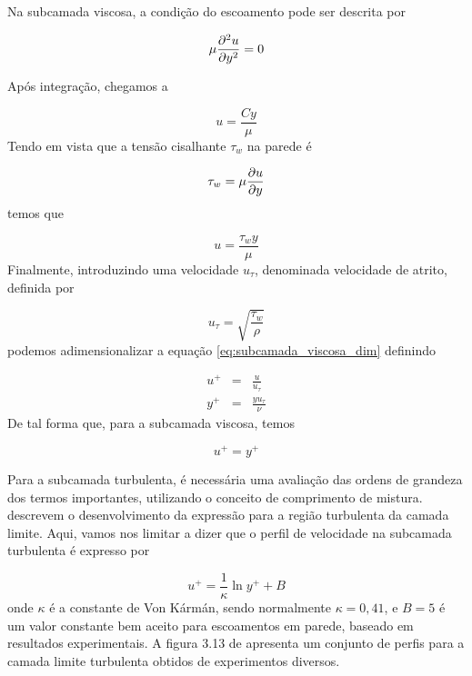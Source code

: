 Na subcamada viscosa, a condição do escoamento pode ser descrita por

\begin{equation}
  \mu\frac{\partial^2u}{\partial y^2} = 0
\end{equation}

Após integração, chegamos a

\begin{equation}
  u = \frac{Cy}{\mu}
\end{equation}
Tendo em vista que a tensão cisalhante $\tau_w$ na parede é

\begin{equation}
  \tau_w = \mu\frac{\partial u}{\partial y}
\end{equation}
temos que

\begin{equation}
  u = \frac{\tau_wy}{\mu}
  \label{eq:subcamada_viscosa_dim}
\end{equation}
Finalmente, introduzindo uma velocidade $u_{\tau}$, denominada velocidade de atrito, definida por

\begin{equation}
  u_{\tau} = \sqrt{\frac{\tau_w}{\rho}}
\end{equation}
podemos adimensionalizar a equação \ref{eq:subcamada_viscosa_dim} definindo

\begin{subequations}
  \begin{eqnarray}
    u^+ &=& \frac{u}{u_{\tau}}\\
    y^+ &=& \frac{yu_{\tau}}{\nu}
  \end{eqnarray}  
\end{subequations}
De tal forma que, para a subcamada viscosa, temos

\begin{equation}
  u^+=y^+
\end{equation}

Para a subcamada turbulenta, é necessária uma avaliação das ordens de grandeza dos termos importantes, utilizando o conceito de comprimento de mistura. \citet{FREIRE02} descrevem o desenvolvimento da expressão para a região turbulenta da camada limite. Aqui, vamos nos limitar a dizer que o perfil de velocidade na subcamada turbulenta é expresso por

\begin{equation}
  u^+=\frac{1}{\kappa}\ln y^+ + B
\end{equation}
onde $\kappa$ é a constante de Von Kármán, sendo normalmente $\kappa=0,41$, e $B = 5$ é um valor constante bem aceito para escoamentos em parede, baseado em resultados experimentais. A figura 3.13 de \citet{FREIRE02} apresenta um conjunto de perfis para a camada limite turbulenta obtidos de experimentos diversos.


